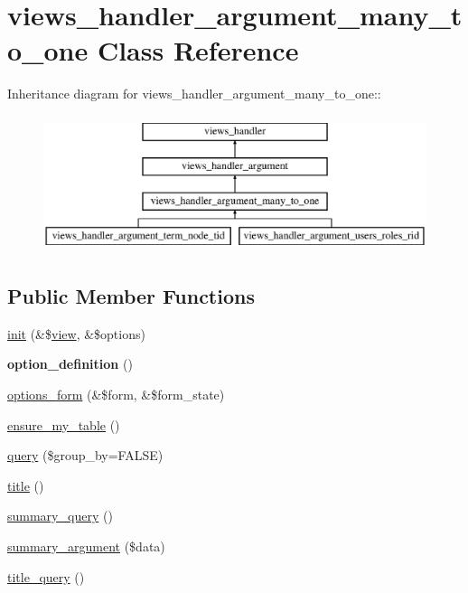 \hypertarget{classviews__handler__argument__many__to__one}{
\section{views\_\-handler\_\-argument\_\-many\_\-to\_\-one Class Reference}
\label{classviews__handler__argument__many__to__one}
}
Inheritance diagram for views\_\-handler\_\-argument\_\-many\_\-to\_\-one::\begin{figure}[H]
\begin{center}
\leavevmode
\includegraphics[height=4cm]{classviews__handler__argument__many__to__one}
\end{center}
\end{figure}
\subsection*{Public Member Functions}
\begin{DoxyCompactItemize}
\item 
\hyperlink{classviews__handler__argument__many__to__one_aec928c8a20acec1623938ab177dbfc8f}{init} (\&\$\hyperlink{classview}{view}, \&\$options)
\item 
\hypertarget{classviews__handler__argument__many__to__one_a4c28692f87058983cc6a4a4d018d710e}{
{\bfseries option\_\-definition} ()}
\label{classviews__handler__argument__many__to__one_a4c28692f87058983cc6a4a4d018d710e}

\item 
\hyperlink{classviews__handler__argument__many__to__one_add3ed7d59f17d79f48ef8f47e049cb92}{options\_\-form} (\&\$form, \&\$form\_\-state)
\item 
\hyperlink{classviews__handler__argument__many__to__one_af6195d516010fbd9cda241fa450a748a}{ensure\_\-my\_\-table} ()
\item 
\hyperlink{classviews__handler__argument__many__to__one_acea956eb95d4490acf996a8282d4aedd}{query} (\$group\_\-by=FALSE)
\item 
\hyperlink{classviews__handler__argument__many__to__one_a624565fe59482f017f2f7935037d9297}{title} ()
\item 
\hyperlink{classviews__handler__argument__many__to__one_a320b34f2327cb15467353d2534d71ddd}{summary\_\-query} ()
\item 
\hyperlink{classviews__handler__argument__many__to__one_a94fb0499ff1078d0423de06d33e898a5}{summary\_\-argument} (\$data)
\item 
\hyperlink{classviews__handler__argument__many__to__one_a0b758f84ee6b9a473313ec92714b06c7}{title\_\-query} ()
\end{DoxyCompactItemize}


